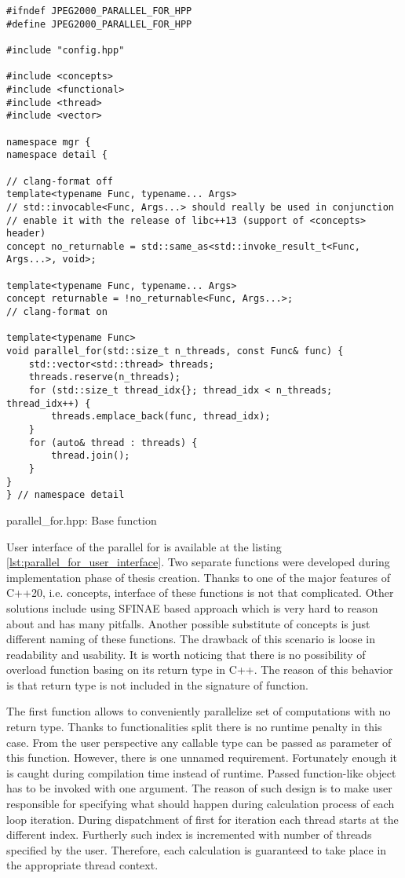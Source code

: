 \begin{listing}[!htb]
\begin{verbatim}
#ifndef JPEG2000_PARALLEL_FOR_HPP
#define JPEG2000_PARALLEL_FOR_HPP

#include "config.hpp"

#include <concepts>
#include <functional>
#include <thread>
#include <vector>

namespace mgr {
namespace detail {

// clang-format off
template<typename Func, typename... Args>
// std::invocable<Func, Args...> should really be used in conjunction
// enable it with the release of libc++13 (support of <concepts> header)
concept no_returnable = std::same_as<std::invoke_result_t<Func, Args...>, void>;

template<typename Func, typename... Args>
concept returnable = !no_returnable<Func, Args...>;
// clang-format on

template<typename Func>
void parallel_for(std::size_t n_threads, const Func& func) {
    std::vector<std::thread> threads;
    threads.reserve(n_threads);
    for (std::size_t thread_idx{}; thread_idx < n_threads; thread_idx++) {
        threads.emplace_back(func, thread_idx);
    }
    for (auto& thread : threads) {
        thread.join();
    }
}
} // namespace detail
\end{verbatim}
\caption{parallel\_for.hpp: Base function}
\label{lst:parallel_for_base_function}
\end{listing}

User interface of the parallel for is available at the listing \ref{lst:parallel_for_user_interface}.
Two separate functions were developed during implementation phase of thesis creation.
Thanks to one of the major features of C++20, i.e. concepts, interface of these functions
is not that complicated. Other solutions include using SFINAE based approach which is very
hard to reason about and has many pitfalls. Another possible substitute of concepts is just
different naming of these functions. The drawback of this scenario is loose in readability
and usability. It is worth noticing that there is no possibility of overload function basing
on its return type in C++. The reason of this behavior is that return type is not included
in the signature of function.

The first function allows to conveniently parallelize set of computations with no return type.
Thanks to functionalities split there is no runtime penalty in this case. From the user perspective
any callable type can be passed as parameter of this function. However, there is one unnamed
requirement. Fortunately enough it is caught during compilation time instead of runtime. Passed
function-like object has to be invoked with one argument. The reason of such design is to
make user responsible for specifying what should happen during calculation process of each
loop iteration. During dispatchment of first for iteration each thread starts at the different index.
Furtherly such index is incremented with number of threads specified by the user. Therefore,
each calculation is guaranteed to take place in the appropriate thread context.

